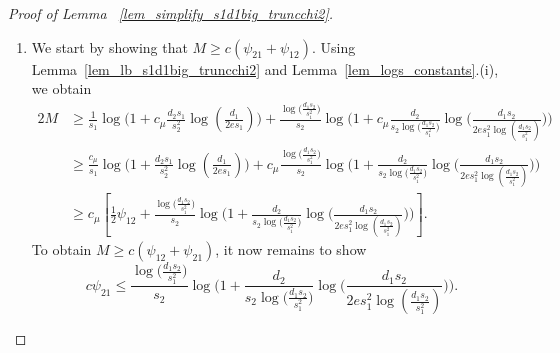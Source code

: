 \documentclass{article}
\theoremstyle{remark}
\begin{document}
\begin{proof}[Proof of Lemma ~\ref{lem_simplify_s1d1big_truncchi2}]
\phantom{ }

\begin{enumerate}
\item We start by showing that $M \geq c(\psi_{21} + \psi_{12})$. 
    Using  Lemma~\ref{lem_lb_s1d1big_truncchi2} and Lemma~\ref{lem_logs_constants}.(i), we obtain
\begin{align*}
    2M &\geq\frac{1}{s_1}\log\Big(1 + c_\mu \frac{d_2s_1}{s_2^2}\log(\frac{d_1}{2es_1})\Big) + \frac{\log\big(\frac{d_1s_2}{s_1^2}\big)}{s_2}\log\Big(1 + c_\mu \frac{d_2}{s_2\log\big(\frac{d_1s_2}{s_1^2}\big)}\log \big(\frac{d_1s_2}{2es_1^2\log(\frac{d_1s_2}{s_1^2})}\big)\Big) \\
    &\geq\frac{c_\mu}{s_1}\log\Big(1 + \frac{d_2s_1}{s_2^2}\log(\frac{d_1}{2es_1})\Big) + c_\mu\frac{\log\big(\frac{d_1s_2}{s_1^2}\big)}{s_2}\log\Big(1 +  \frac{d_2}{s_2\log\big(\frac{d_1s_2}{s_1^2}\big)}\log \big(\frac{d_1s_2}{2es_1^2\log(\frac{d_1s_2}{s_1^2})}\big)\Big) \\
    &\geq c_\mu \left[\frac{1}{2}\psi_{12} + \frac{\log\big(\frac{d_1s_2}{s_1^2}\big)}{s_2}\log\Big(1 + \frac{d_2}{s_2\log\big(\frac{d_1s_2}{s_1^2}\big)}\log \big(\frac{d_1s_2}{2es_1^2\log(\frac{d_1s_2}{s_1^2})}\big)\Big)\right].
\end{align*}
To obtain $M \geq c(\psi_{12} + \psi_{21})$, it now remains to show
\[c\psi_{21} \leq \frac{\log\big(\frac{d_1s_2}{s_1^2}\big)}{s_2}\log\Big(1 + \frac{d_2}{s_2\log\big(\frac{d_1s_2}{s_1^2}\big)}\log \big(\frac{d_1s_2}{2es_1^2\log(\frac{d_1s_2}{s_1^2})}\big)\Big).\]


\end{enumerate}
\end{proof}
\end{document}
